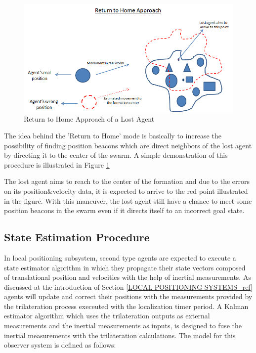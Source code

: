 \begin{figure}[H]
\caption{Return to Home Approach of a Lost Agent} \label{return_home_ref}
\centering
\includegraphics[scale = 0.60]{return_home}
\end{figure}

The idea behind the 'Return to Home' mode is basically to increase the possibility of finding position beacons which are direct neighbors of the lost agent by directing it to the center of the swarm. A simple demonstration of this procedure is illustrated in Figure \ref{return_home_ref}
	
The lost agent aims to reach to the center of the formation and due to the errors on its position$\&$velocity data, it is expected to arrive to the red point illustrated in the figure. With this maneuver, the lost agent still have a chance to meet some position beacons in the swarm even if it directs itself to an incorrect goal state.
	
\subsection{State Estimation Procedure} \label{StateEstimationref}
In local positioning subsystem, second type agents are expected to execute a state estimator algorithm in which they propagate their state vectors composed of translational position and velocities with the help of inertial measurements. As discussed at the introduction of Section \ref{LOCAL POSITIONING SYSTEMS_ref} agents will update and correct their positions with the measurements provided by the trilateration process execeuted with the localization timer period. A Kalman estimator algorithm which uses the trilateration outputs as external measurements and the inertial measurements as inputs, is designed to fuse the inertial measurements with the trilateration calculations. The model for this observer system is defined as follows:
	
